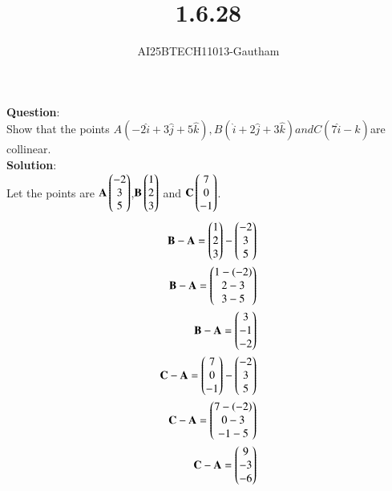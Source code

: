\documentclass[journal]{IEEEtran}
\begin{document}

\vspace{3cm}

\title{1.6.28}
\author{AI25BTECH11013-Gautham}
 \maketitle
{\let\newpage\relax\maketitle}

\renewcommand{\thefigure}{\theenumi}
\renewcommand{\thetable}{\theenumi}
\setlength{\intextsep}{10pt} %


\renewcommand{\thetable}{\theenumi}
\textbf{Question}:\\
Show that the points $A(-2\hat{i}+3\hat{j}+5\hat{k}),B(\hat{i}+2\hat{j}+3\hat{k}) and C(7\hat{i}-\hat{k})$are collinear.  \\
\textbf{Solution}:\\
Let the points are $\mathbf{A}\begin{pmatrix}-2\\3\\5\end{pmatrix}$,$\mathbf{B}\begin{pmatrix}1\\2\\3\end{pmatrix}$ and $\mathbf{C}\begin{pmatrix}7\\0\\-1\end{pmatrix}$.
\begin{align}
\mathbf{B} - \mathbf{A} = \begin{pmatrix}1\\2\\3\end{pmatrix} - \begin{pmatrix}-2\\3\\5\end{pmatrix}  \\
\mathbf{B} - \mathbf{A} = \begin{pmatrix}1-(-2)\\2-3\\3-5\end{pmatrix}  \\
\mathbf{B} - \mathbf{A} = \begin{pmatrix}3\\-1\\-2\end{pmatrix}  \\
\mathbf{C} - \mathbf{A} = \begin{pmatrix}7\\0\\-1\end{pmatrix} - \begin{pmatrix}-2\\3\\5\end{pmatrix}  \\
\mathbf{C} - \mathbf{A} = \begin{pmatrix}7-(-2)\\0-3\\-1-5\end{pmatrix}  \\
\mathbf{C} - \mathbf{A} = \begin{pmatrix}9\\-3\\-6\end{pmatrix}  \\
\end{align}
\end{document}
